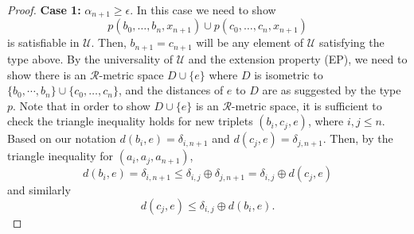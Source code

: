 \documentclass{article}
\theoremstyle{remark}
\theoremstyle{definition}
\newcommand{\U}[0]{\mathbb{U}}
\renewcommand{\U}[0]{\mathcal{U}}
\renewcommand\leq{\leqslant}
\renewcommand\geq{\geqslant}
\newcommand{\rr}[0]{\mathcal{R}}
\begin{document}
{{{{{\begin{proof}
\textbf{Case 1:} $\alpha_{n+1}\geq\epsilon$. In this case we need to show \begin{equation}\label{typesat1}
   p(b_0, \dots, b_n, x_{n+1})\cup p(c_0, \dots, c_n, x_{n+1}) 
\end{equation}
is satisfiable in $\U$. Then, $b_{n+1}=c_{n+1}$ will be any element of $\U$ satisfying the type above. By the universality of $\U$ and the extension property (EP), we need to show there is an $\rr$-metric space $D\cup \{e\}$ where $D$ is isometric to $\{b_0,\cdots,b_n\}\cup \{c_0,\dots,c_n\}$, and the distances of $e$ to $D$ are as suggested by the type $p$. Note that in order to show $D\cup \{e\}$ is an $\rr$-metric space, it is sufficient to check the triangle inequality holds for new triplets $(b_i,c_j,e)$, where $i,j\leq n$.
Based on our notation $d(b_i,e)=\delta_{i,n+1}$ and $d(c_j,e)=\delta_{j,n+1}$. Then, by the triangle inequality for $(a_i, a_j, a_{n+1})$,
\begin{equation}\label{a1}
    d(b_i, e)=\delta_{i, n+1}\leq \delta_{i,j}\oplus\delta_{j, n+1}=\delta_{i,j}\oplus d(c_j,e)
\end{equation}
and similarly 
\begin{equation}\label{a2} d(c_j, e)\leq \delta_{i,j}\oplus d(b_i,e).\end{equation}


\end{proof}}}}}}
\end{document}
